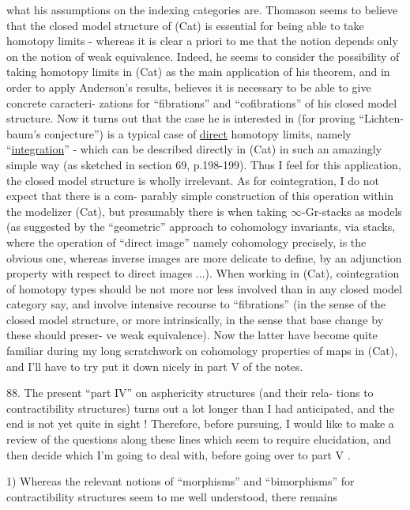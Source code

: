 
what his assumptions on the indexing categories are.  Thomason seems to
believe that the closed model structure of (Cat) is essential for being
able to take homotopy limits  -  whereas it is clear a priori to me that
the notion  depends only on the notion of weak equivalence.  Indeed,
he seems to consider the possibility of taking homotopy limits in (Cat)
as the main application of his theorem,  and in order to apply Anderson's
results,  believes it is necessary to be able to give concrete caracteri-%
zations for ``fibrations'' and ``cofibrations'' of his closed model structure.
Now it turns out that the case he is interested in (for proving ``Lichten-%
baum's conjecture'') is  a typical case of \uline{direct} homotopy
limits,  namely ``\uline{integration}''  -  which can be described directly in (Cat)
in such an amazingly simple way (as sketched in section 69, p.198-199).
Thus I feel for this application,  the closed model structure is wholly
irrelevant.  As for cointegration,  I do not expect that there is a com-%
parably simple construction of this operation  within the modelizer (Cat),
but presumably there is when taking $\infty$-Gr-stacks as models  (as suggested
by the ``geometric'' approach to cohomology invariants,  via stacks, 
where the operation of ``direct image''  namely cohomology precisely,  is
the obvious one,  whereas inverse images are more delicate to define, by
an adjunction property with respect to direct images ...).  When working
in (Cat),  cointegration of homotopy types should be not more nor less
involved than in  any closed model category say,  and involve intensive
recourse to ``fibrations'' (in the sense of the closed model structure,  or
more intrinsically,  in the sense that base change by these should preser-%
ve weak equivalence).  Now  the latter have become quite familiar 
during my long scratchwork on cohomology properties of maps in (Cat),
and I'll  have to try put it down nicely in part V of the notes.

88.     The present ``part IV''  on asphericity structures (and their rela-%
tions to contractibility structures)  turns out a lot longer than I had
anticipated,  and the end is not yet quite in sight !  Therefore,  before
pursuing,  I would like to make a review of the questions  along
these lines which seem to require elucidation,  and then decide which I'm
going to deal with,  before going over to part V .

1)   Whereas the relevant notions of ``morphisms''  and ``bimorphisms''
for contractibility structures seem to me well understood,  there remains

